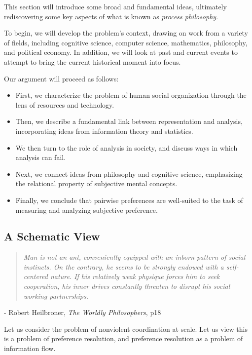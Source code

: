 
This section will introduce some broad and fundamental ideas, ultimately rediscovering some key aspects of what is known as \textit{process philosophy}.

To begin, we will develop the problem's context, drawing on work from a variety of fields, including cognitive science, computer science, mathematics, philosophy, and political economy.
In addition, we will look at past and current events to attempt to bring the current historical moment into focus.

\bigskip

Our argument will proceed as follows:

\begin{itemize}
	\item First, we characterize the problem of human social organization through the lens of resources and technology.
	\item Then, we describe a fundamental link between representation and analysis, incorporating ideas from information theory and statistics.
	\item We then turn to the role of analysis in society, and discuss ways in which analysis can fail.
	\item Next, we connect ideas from philosophy and cognitive science, emphasizing the relational property of subjective mental concepts.
	\item Finally, we conclude that pairwise preferences are well-suited to the task of measuring and analyzing subjective preference.
\end{itemize}

\subsection{A Schematic View}

\begin{center}
\begin{quotation}
\textit{Man is not an ant, conveniently equipped with an inborn pattern of social instincts.
	On the contrary, he seems to be strongly endowed with a self-centered nature.
	If his relatively weak physique forces him to seek cooperation, his inner drives constantly threaten to disrupt his social working partnerships.}
\end{quotation}
	- Robert Heilbroner, \textit{The Worldly Philosophers}, p18
\end{center}

Let us consider the problem of nonviolent coordination at scale.
Let us view this is a problem of preference resolution, and preference resolution as a problem of information flow.


